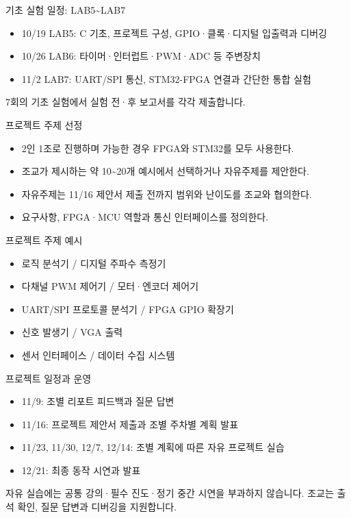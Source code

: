 \documentclass[aspectratio=169,11pt,t]{beamer}
\begin{document}
\begin{frame}{기초 실험 일정: LAB5\textasciitilde{}LAB7}
\begin{itemize}
\item 10/19 LAB5: C 기초, 프로젝트 구성, GPIO·클록·디지털 입출력과 디버깅
\item 10/26 LAB6: 타이머·인터럽트·PWM·ADC 등 주변장치
\item 11/2 LAB7: UART/SPI 통신, STM32-FPGA 연결과 간단한 통합 실험
\end{itemize}
\vspace{0.35cm}
7회의 기초 실험에서 실험 전·후 보고서를 각각 제출합니다.
\end{frame}

\begin{frame}{프로젝트 주제 선정}
\begin{itemize}
\item 2인 1조로 진행하며 가능한 경우 FPGA와 STM32를 모두 사용한다.
\item 조교가 제시하는 약 10\textasciitilde{}20개 예시에서 선택하거나 자유주제를 제안한다.
\item 자유주제는 11/16 제안서 제출 전까지 범위와 난이도를 조교와 협의한다.
\item 요구사항, FPGA·MCU 역할과 통신 인터페이스를 정의한다.
\end{itemize}
\end{frame}

\begin{frame}{프로젝트 주제 예시}
\begin{itemize}
\item 로직 분석기 / 디지털 주파수 측정기
\item 다채널 PWM 제어기 / 모터·엔코더 제어기
\item UART/SPI 프로토콜 분석기 / FPGA GPIO 확장기
\item 신호 발생기 / VGA 출력
\item 센서 인터페이스 / 데이터 수집 시스템
\end{itemize}
\end{frame}

\begin{frame}{프로젝트 일정과 운영}
\begin{itemize}
\item 11/9: 조별 리포트 피드백과 질문 답변
\item 11/16: 프로젝트 제안서 제출과 조별 주차별 계획 발표
\item 11/23, 11/30, 12/7, 12/14: 조별 계획에 따른 자유 프로젝트 실습
\item 12/21: 최종 동작 시연과 발표
\end{itemize}
\vspace{0.35cm}
자유 실습에는 공통 강의·필수 진도·정기 중간 시연을 부과하지 않습니다. 조교는 출석 확인, 질문 답변과 디버깅을 지원합니다.
\end{frame}
\end{document}
